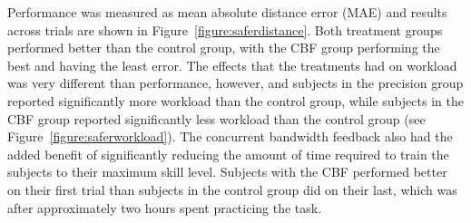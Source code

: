 Performance was measured as mean absolute distance error (MAE) and results across trials are shown in Figure~\ref{figure:saferdistance}.
Both treatment groups performed better than the control group, with the CBF group performing the best and having the least error.
The effects that the treatments had on workload was very different than performance, however, and subjects in the precision group reported significantly more workload than the control group, while subjects in the CBF group reported significantly less workload than the control group (see Figure~\ref{figure:saferworkload}).
The concurrent bandwidth feedback also had the added benefit of significantly reducing the amount of time required to train the subjects to their maximum skill level.
Subjects with the CBF performed better on their first trial than subjects in the control group did on their last, which was after approximately two hours spent practicing the task.

